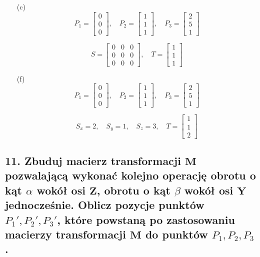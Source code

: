 \begin{enumerate}
    \item[(c)] 
    \[
    P_1 = \begin{bmatrix} 0 \\ 0 \\ 0  \end{bmatrix}, 
    \quad P_2 = \begin{bmatrix} 1 \\ 1 \\ 1  \end{bmatrix}, 
    \quad P_3 = \begin{bmatrix} 2 \\ 5 \\ 1  \end{bmatrix}
    \]

    \[
    S = \begin{bmatrix} 0 & 0 & 0 \\ 0 & 0 & 0 \\ 0 & 0 & 0 \end{bmatrix}, 
    \quad T = \begin{bmatrix} 1 \\ 1 \\ 1 \end{bmatrix}
    \]

    \item[(f)] 
    \[
    P_1 = \begin{bmatrix} 0 \\ 0 \\ 0  \end{bmatrix}, 
    \quad P_2 = \begin{bmatrix} 1 \\ 1 \\ 1  \end{bmatrix}, 
    \quad P_3 = \begin{bmatrix} 2 \\ 5 \\ 1  \end{bmatrix}
    \]

    \[
    S_x = 2, \quad S_y = 1, \quad S_z = 3, 
    \quad T = \begin{bmatrix} 1 \\ 1 \\ 2 \end{bmatrix}
    \]

\end{enumerate}


\subsection*{11. Zbuduj macierz transformacji \( \mathbf{M} \) pozwalającą wykonać kolejno operację obrotu o kąt \( \alpha \) wokół osi \( \mathbf{Z} \), obrotu o kąt \( \beta \) wokół osi \( \mathbf{Y} \) jednocześnie. 
Oblicz pozycje punktów \( P_1', P_2', P_3' \), które powstaną po zastosowaniu macierzy transformacji \( \mathbf{M} \) do punktów \( P_1, P_2, P_3 \).}

